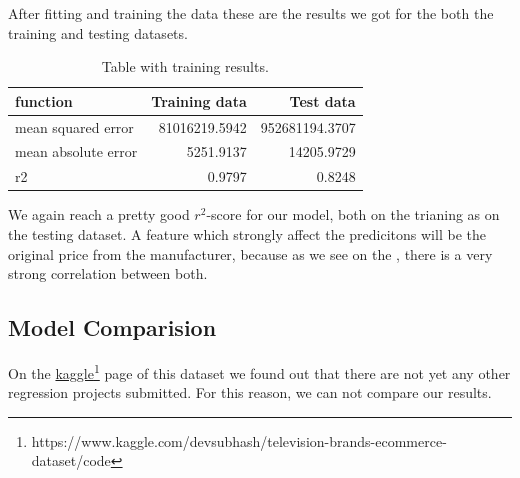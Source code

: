 After fitting and training the data these are the results we got for the both the training and testing datasets.

\begin{table}[htp]
    \begin{center}
        \caption{Table with training results.}
        \label{tab:training results}
        \begin{tabular}{l|r|r} %
            \textbf{function} & \textbf{Training data} & \textbf{Test data} \\
            \hline
            mean squared error & 81016219.5942 & 952681194.3707 \\
            mean absolute error & 5251.9137 & 14205.9729 \\
            r2 & 0.9797 & 0.8248\\
        \end{tabular}
    \end{center}
\end{table}

We again reach a pretty good $r^2$-score for our model, both on the trianing as on the testing dataset. A feature which strongly affect the predicitons will be the original price from the manufacturer, because as we see on the , there is a very strong correlation between both.

\subsection{Model Comparision}
\newcommand{\kagglelinktvcode}{https://www.kaggle.com/devsubhash/television-brands-ecommerce-dataset/code}

On the \href{\kagglelinktvcode}{kaggle\footnote{\url{\kagglelinktvcode}}} page of this dataset we found out that there are not yet any other regression projects submitted. For this reason, we can not compare our results.
